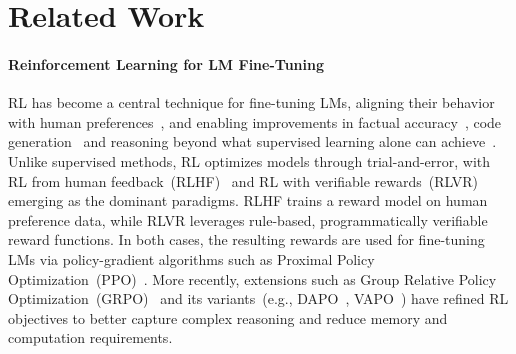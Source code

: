 \documentclass[11pt, a4paper, logo, singlecolumn, copyright]{gensyn}
\begin{document}
\section{Related Work}

\paragraph{Reinforcement Learning for LM Fine-Tuning}
RL has become a central technique for fine-tuning LMs, aligning their behavior with human preferences~\citep{openai2022instructionfollowing,openai2024learningtoreason}, and enabling improvements in factual accuracy~\citep{tian2023finetuning}, code generation~\citep{le2022coderlmasteringcodegeneration} and reasoning beyond what supervised learning alone can achieve~\citep{openai2022instructionfollowing,openai2024learningtoreason,deepseekai2025deepseekr1incentivizingreasoningcapability}. Unlike supervised methods, RL optimizes models through trial-and-error, with RL from human feedback~(RLHF)~\citep{ziegler2020finetuninglanguagemodelshuman,ouyang2022traininglanguagemodelsfollow} and RL with verifiable rewards~(RLVR)~\citep{gao2024designingeffectiverlreward,lambert2025tulu3pushingfrontiers,deepseekai2025deepseekr1incentivizingreasoningcapability} emerging as the dominant paradigms. RLHF trains a reward model on human preference data, while RLVR leverages rule-based, programmatically verifiable reward functions. In both cases, the resulting rewards are used for fine-tuning LMs via policy-gradient algorithms such as Proximal Policy Optimization~(PPO)~\citep{schulman2017proximalpolicyoptimizationalgorithms}. More recently, extensions such as Group Relative Policy Optimization~(GRPO)~\citep{shao2024deepseekmathpushinglimitsmathematical} and its variants~(e.g., DAPO~\citep{yu2025dapoopensourcellmreinforcement}, VAPO~\citep{yue2025vapoefficientreliablereinforcement}) have refined RL objectives to better capture complex reasoning and reduce memory and computation requirements.
\end{document}
